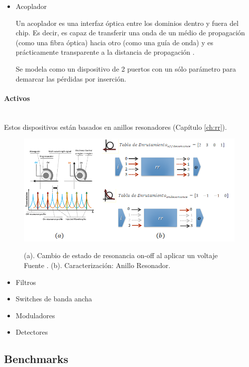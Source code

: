 \begin{itemize}
\item Acoplador

Un acoplador es una interfaz óptica entre los dominios dentro y fuera del chip. 
Es decir, es capaz de transferir una onda de un médio de propagación (como una
fibra óptica) hacia otro (como una guía de onda) y es prácticamente transparente
a la distancia de propagación \cite{Chan2011}.

Se modela como un dispositivo de 2 puertos con un sólo parámetro para demarcar
las pérdidas por inserción.

\end{itemize}

\paragraph{Activos}~\\

Estos dispositivos están basados en anillos resonadores (Capítulo \ref{ch:rr}).

\begin{figure}[H]
\caption{(a). Cambio de estado de resonancia on-off
al aplicar un voltaje Fuente \cite{hendry2011time}. (b). Caracterización: Anillo Resonador.}
\centering
\includegraphics[width=1.0\textwidth,natwidth=800,natheight=390]{figs/rr.png}
\label{fig:phoenix_wgc}
\end{figure}

\begin{itemize}
\item Filtros
\item Switches de banda ancha
\item Moduladores
\item Detectores
\end{itemize}  


\subsection{Benchmarks}
